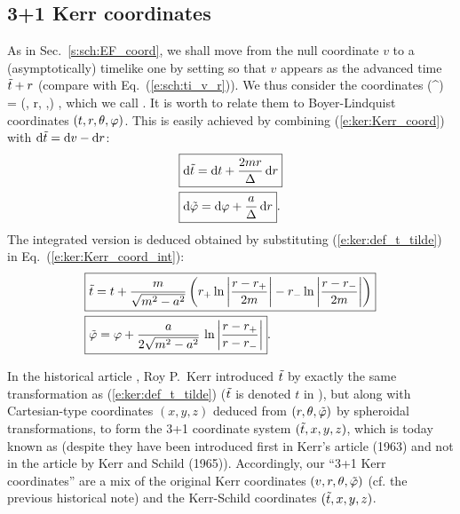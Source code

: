 \subsection{3+1 Kerr coordinates}

As in Sec.~\ref{s:sch:EF_coord},
we shall move from the null coordinate $v$ to a (asymptotically)
timelike one by setting
\be \label{e:ker:def_t_tilde}
     \iff {}
\ee
so that $v$ appears as the advanced time ${\tilde t}+r$ (compare with Eq.~(\ref{e:sch:ti_v_r})). We thus consider
the coordinates
\be
    (^\alpha) = (\ti, r, \th,\tph) ,
\ee
which we call
.
It is worth to relate them to Boyer-Lindquist coordinates
$(t,r,\theta,\varphi)$. This is easily achieved
by combining (\ref{e:ker:Kerr_coord}) with $\mathrm{d}{\tilde t} = \mathrm{d} v - \mathrm{d} r$:
\begin{subequations}
\label{e:ker:Kerr_3p1_BL}
\begin{align}
& \fbox{$\displaystyle \mathrm{d} {\tilde t} = \mathrm{d} t + \frac{2m r}{\Delta} \, \mathrm{d} r$} \\
& \fbox{$\displaystyle \mathrm{d} {\tilde\varphi} = \mathrm{d} \varphi + \frac{a}{\Delta}\, \mathrm{d} r$} .
\end{align}
\end{subequations}
The integrated version is deduced obtained by substituting (\ref{e:ker:def_t_tilde}) in
Eq.~(\ref{e:ker:Kerr_coord_int}):
\begin{subequations}
\begin{align}
& \fbox{$\displaystyle {\tilde t} = t  + \frac{m}{\sqrt{m^2-a^2}} \left(
    r_+ \ln\left| \frac{r-r_+}{2m} \right|
    - r_- \ln\left| \frac{r-r_-}{2m} \right| \right) $}\\
& \fbox{$\displaystyle  {\tilde\varphi} = \varphi + \frac{a}{2\sqrt{m^2-a^2}}\, \ln \left|
    \frac{r-r_+}{r-r_-} \right| $} .
\end{align}
\end{subequations}


\begin{hist}
In the historical article \cite{Kerr63}, Roy P.~Kerr introduced ${\tilde t}$ by exactly
the same transformation as (\ref{e:ker:def_t_tilde}) (${\tilde t}$ is denoted $t$
in \cite{Kerr63}), but along with Cartesian-type coordinates $(x,y,z)$
deduced from $(r,\theta,{\tilde\varphi})$ by spheroidal transformations, to form the 3+1
coordinate system $({\tilde t},x,y,z)$, which is today known as
 (despite
they have been introduced first in Kerr's article \cite{Kerr63} (1963) and not
in the article by Kerr and Schild \cite{KerrS65} (1965)). Accordingly,
our ``3+1 Kerr coordinates'' are a mix of the original Kerr coordinates
$(v,r,\theta,{\tilde\varphi})$ (cf. the previous historical note)
and the Kerr-Schild coordinates $({\tilde t},x,y,z)$.
\end{hist}

